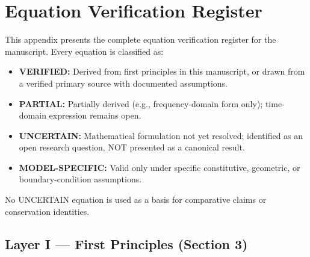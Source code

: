 \section{Equation Verification Register}
\label{app:equation_register}

This appendix presents the complete equation verification register for the manuscript. Every equation is classified as:

\begin{itemize}
\item \textbf{VERIFIED:} Derived from first principles in this manuscript, or drawn from a verified primary source with documented assumptions.
\item \textbf{PARTIAL:} Partially derived (e.g., frequency-domain form only); time-domain expression remains open.
\item \textbf{UNCERTAIN:} Mathematical formulation not yet resolved; identified as an open research question, NOT presented as a canonical result.
\item \textbf{MODEL-SPECIFIC:} Valid only under specific constitutive, geometric, or boundary-condition assumptions.
\end{itemize}

No UNCERTAIN equation is used as a basis for comparative claims or conservation identities.

\subsection{Layer I — First Principles (Section 3)}

